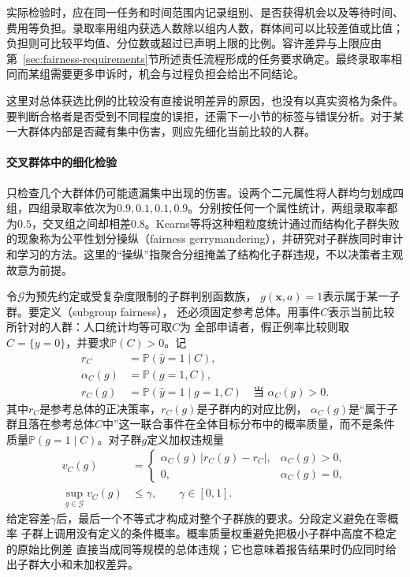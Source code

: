 实际检验时，应在同一任务和时间范围内记录组别、是否获得机会以及等待时间、费用等负担。录取率用组内获选人数除以组内人数，群体间可以比较差值或比值；负担则可比较平均值、分位数或超过已声明上限的比例。容许差异与上限应由第~\ref{sec:fairness-requirements}节所述责任流程形成的任务要求确定。最终录取率相同而某组需要更多申诉时，机会与过程负担会给出不同结论。

这里对总体获选比例的比较没有直接说明差异的原因，也没有以真实资格为条件。要判断合格者是否受到不同程度的误拒，还需下一小节的标签与错误分析。对于某一大群体内部是否藏有集中伤害，则应先细化当前比较的人群。

\paragraph{交叉群体中的细化检验}

只检查几个大群体仍可能遗漏集中出现的伤害。设两个二元属性将人群均匀划成四组，四组录取率依次为$0.9,0.1,0.1,0.9$。分别按任何一个属性统计，两组录取率都为$0.5$，交叉组之间却相差$0.8$。Kearns等将这种粗粒度统计通过而结构化子群失败的现象称为公平性划分操纵（fairness gerrymandering），并研究对子群族同时审计和学习的方法。这里的“操纵”指聚合分组掩盖了结构化子群违规，不以决策者主观故意为前提。

令$\mathcal G$为预先约定或受复杂度限制的子群判别函数族，
$g(\bm{x},a)=1$表示属于某一子群。要定义（subgroup fairness），
还必须固定参考总体。用事件$C$表示当前比较所针对的人群：人口统计均等可取$C$为
全部申请者，假正例率比较则取$C=\{y=0\}$，并要求$\mathbb P(C)>0$。记
\begin{align*}
 r_C&=\mathbb P(\hat y=1\mid C),\\
 \alpha_C(g)&=\mathbb P(g=1,C),\\
 r_C(g)&=\mathbb P(\hat y=1\mid g=1,C)
 \quad\text{当 }\alpha_C(g)>0.
\end{align*}
其中$r_C$是参考总体的正决策率，$r_C(g)$是子群内的对应比例，
$\alpha_C(g)$是“属于子群且落在参考总体$C$中”这一联合事件在全体目标分布中的概率质量，而不是条件质量$\mathbb P(g=1\mid C)$。对子群$g$定义加权违规量
\begin{equation}
 \begin{aligned}
 v_C(g)&=
 \begin{cases}
  \alpha_C(g)\,|r_C(g)-r_C|,&\alpha_C(g)>0,\\
  0,&\alpha_C(g)=0,
 \end{cases}\\
 \sup_{g\in\mathcal G}v_C(g)&\leq\gamma,\qquad \gamma\in[0,1].
 \end{aligned}
 \label{eq:fairness-subgroup-violation}
\end{equation}
给定容差$\gamma$后，最后一个不等式才构成对整个子群族的要求。分段定义避免在零概率
子群上调用没有定义的条件概率。概率质量权重避免把极小子群中高度不稳定的原始比例差
直接当成同等规模的总体违规；它也意味着报告结果时仍应同时给出子群大小和未加权差异。

